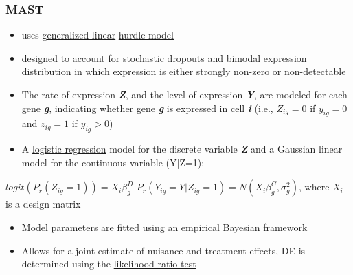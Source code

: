 \documentclass{beamer}\usepackage[]{graphicx}\usepackage[]{color}
\begin{document}
\begin{frame}
\frametitle{MAST}
\begin{itemize}
  \item uses \href{https://onlinecourses.science.psu.edu/stat504/node/216}{generalized linear} \href{http://data.library.virginia.edu/getting-started-with-hurdle-models/}{hurdle model}
  \item designed to account for stochastic dropouts and bimodal expression distribution in which expression is either strongly non-zero or non-detectable
  \item The rate of expression \textbf{\textit{Z}}, and the level of expression \textbf{\textit{Y}}, are modeled for each gene \textbf{\textit{g}}, indicating whether gene \textbf{\textit{g}} is expressed in cell \textbf{\textit{i}} (i.e., $Z_{ig}=0$ if $y_{ig}=0$ and $z_{ig}=1$ if $y_{ig}>0$)
  \item A \href{https://stats.idre.ucla.edu/stata/webbooks/logistic/chapter1/logistic-regression-with-statachapter-1-introduction-to-logistic-regression-with-stata/}{logistic regression} model for the discrete variable \textbf{\textit{Z}} and a Gaussian linear model for the continuous variable (Y|Z=1):
   \end{itemize}
   \begin{center}
    $logit (P_r(Z_{ig}=1))=X_i\beta_g^D$ \newline
    $P_r(Y_{ig}=Y|Z_{ig}=1)=N(X_i\beta_g^C,\sigma_g^2)$, where $X_i$ is a design matrix
\end{center}
\begin{itemize}
\item Model parameters are fitted using an empirical Bayesian framework
\item Allows for a joint estimate of nuisance and treatment effects, DE is determined using the \href{https://onlinecourses.science.psu.edu/stat414/node/247}{likelihood ratio test}
\end{itemize}
\end{frame}
\end{document}
